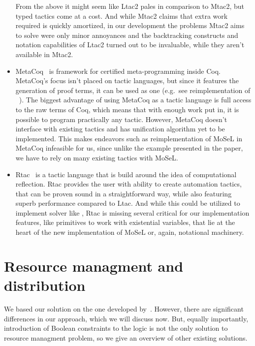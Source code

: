\begin{itemize}
  From the above it might seem like Ltac2 pales in comparison to Mtac2, but typed tactics come at a cost.
  And while Mtac2 claims that extra work required is quickly amortized, in our development the problems Mtac2 aims to solve were only minor annoyances and the backtracking constructs and notation capabilities of Ltac2 turned out to be invaluable, while they aren't available in Mtac2.
\item MetaCoq~\cite{sozeauMetaCoqProject2020} is framework for certified meta-programming inside Coq.
  MetaCoq's focus isn't placed on tactic languages, but since it features the generation of proof terms, it can be used as one (e.g.\ see reimplementation of ~\cite[Section~4.2]{sozeauMetaCoqProject2020}).
  The biggest advantage of using MetaCoq as a tactic language is full access to the raw terms of Coq, which means that with enough work put in, it is possible to program practically any tactic.
  However, MetaCoq doesn't interface with existing tactics and has unification algorithm yet to be implemented.
  This makes endeavors such as reimplementation of MoSeL in MetaCoq infeasible for us, since unlike the example presented in the paper, we have to rely on many existing tactics with MoSeL.
\item Rtac~\cite{malechaExtensibleEfficientAutomation2016} is a tactic language that is build around the idea of computational reflection.
  Rtac provides the user with ability to create automation tactics, that can be proven sound in a straightforward way, while also featuring superb performance compared to Ltac.
  And while this could be utilized to implement solver like , Rtac is missing several critical for our implementation features, like primitives to work with existential variables, that lie at the heart of the new implementation of MoSeL or, again, notational machinery.
\end{itemize}

\section{Resource managment and distribution}
\label{sec:reso-managm-distr}
We based our solution on the one developed by~\citet{harlandResourceDistributionBooleanConstraints2003}.
However, there are significant differences in our approach, which we will discuss now.
But, equally importantly, introduction of Boolean constraints to the logic is not the only solution to resource managment problem, so we give an overview of other existing solutions.


